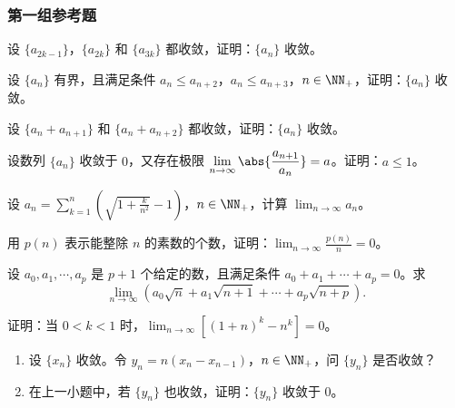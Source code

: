 \subsubsection*{第一组参考题}

\begin{xreferenceproblem}[1]
设 $\{a_{2k-1}\}$，$\{a_{2k}\}$ 和 $\{a_{3k}\}$ 都收敛，证明：$\{a_n\}$ 收敛。
\end{xreferenceproblem}

\begin{xreferenceproblem}[2]
设 $\{a_n\}$ 有界，且满足条件 $a_n\le a_{n+2}$，$a_n\le a_{n+3}$，$n\in\NN_+$，证明：$\{a_n\}$ 收敛。
\end{xreferenceproblem}

\begin{xreferenceproblem}[3]
设 $\{a_n+a_{n+1}\}$ 和 $\{a_n+a_{n+2}\}$ 都收敛，证明：$\{a_n\}$ 收敛。
\end{xreferenceproblem}

\begin{xreferenceproblem}[4]
设数列 $\{a_n\}$ 收敛于 $0$，又存在极限 $\displaystyle\lim_{n\to\infty}\abs{\frac{a_{n+1}}{a_n}}=a$。证明：$a\le1$。
\end{xreferenceproblem}

\begin{xreferenceproblem}[5]
设 $a_n=\displaystyle\sum_{k=1}^n\left(\sqrt{1+\frac{k}{n^2}}-1\right)$，$n\in\NN_+$，计算 $\displaystyle\lim_{n\to\infty}a_n$。
\end{xreferenceproblem}

\begin{xreferenceproblem}[6]
用 $p(n)$ 表示能整除 $n$ 的素数的个数，证明：$\displaystyle\lim_{n\to\infty}\frac{p(n)}n=0$。
\end{xreferenceproblem}

\begin{xreferenceproblem}[7]
设 $a_0,a_1,\cdots,a_p$ 是 $p+1$ 个给定的数，且满足条件 $a_0+a_1+\cdots+a_p=0$。求
  \[
    \lim_{n\to\infty}\left(a_0\sqrt n+a_1\sqrt{n+1}+\cdots+a_p\sqrt{n+p}\right).
  \]
\end{xreferenceproblem}

\begin{xreferenceproblem}[8]
证明：当 $0<k<1$ 时，$\displaystyle\lim_{n\to\infty}[(1+n)^k-n^k]=0$。
\end{xreferenceproblem}

\begin{xreferenceproblem}[9]
\begin{enumerate}[label=(\arabic*)]
    \item 设 $\{x_n\}$ 收敛。令 $y_n=n(x_n-x_{n-1})$，$n\in\NN_+$，问 $\{y_n\}$ 是否收敛？
    \item 在上一小题中，若 $\{y_n\}$ 也收敛，证明：$\{y_n\}$ 收敛于 $0$。
  \end{enumerate}
\end{xreferenceproblem}

